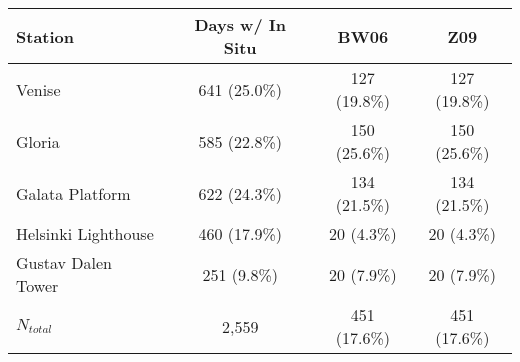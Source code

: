 \documentclass[preview]{standalone}
\begin{document}
\begin{table}
\begin{tabular}{lccc}\hline
Station                 & Days w/ In Situ   & BW06         & Z09          \\\hline
Venise                  & 641 (25.0\%)      & 127 (19.8\%) & 127 (19.8\%) \\
Gloria                  & 585 (22.8\%)      & 150 (25.6\%) & 150 (25.6\%) \\
Galata Platform         & 622 (24.3\%)      & 134 (21.5\%) & 134 (21.5\%) \\
Helsinki Lighthouse     & 460 (17.9\%)      & 20 (4.3\%)   & 20 (4.3\%)   \\
Gustav Dalen Tower      & 251 (9.8\%)       & 20 (7.9\%)   & 20 (7.9\%)   \\\hline
$N_{total}$             & 2,559             & 451 (17.6\%) & 451 (17.6\%) \\

\end{tabular}
\end{table}
\end{document}
